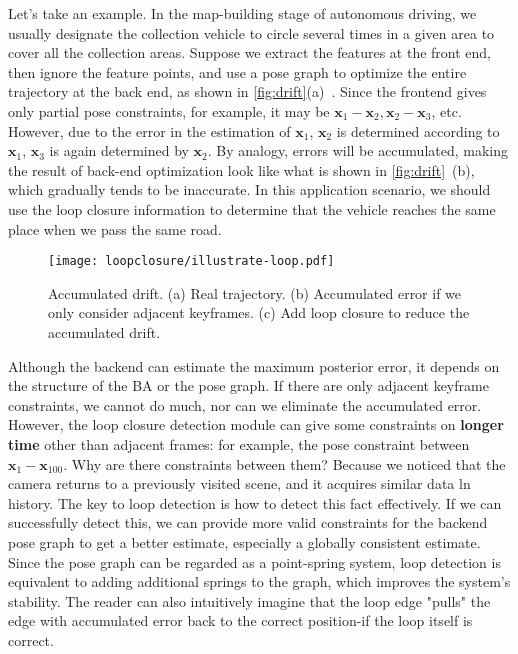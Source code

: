Let's take an example. In the map-building stage of autonomous driving, we usually designate the collection vehicle to circle several times in a given area to cover all the collection areas. Suppose we extract the features at the front end, then ignore the feature points, and use a pose graph to optimize the entire trajectory at the back end, as shown in \autoref{fig:drift}(a)~. Since the frontend gives only partial pose constraints, for example, it may be $\bm{x}_1-\bm{x}_2, \bm{x}_2-\bm{x}_3$, etc. However, due to the error in the estimation of $\bm{x}_1$, $\bm{x}_2$ is determined according to $\bm{x}_1$, $\bm{x}_3$ is again determined by $ \bm{x}_2$. By analogy, errors will be accumulated, making the result of back-end optimization look like what is shown in \autoref{fig:drift}~(b), which gradually tends to be inaccurate. In this application scenario, we should use the loop closure information to determine that the vehicle reaches the same place when we pass the same road.

\begin{figure}[!htp]
	\centering
	\texttt{[image: loopclosure/illustrate-loop.pdf]}
	\caption{Accumulated drift. (a) Real trajectory. (b) Accumulated error if we only consider adjacent keyframes. (c) Add loop closure to reduce the accumulated drift. }
	\label{fig:drift}
\end{figure}

Although the backend can estimate the maximum posterior error, it depends on the structure of the BA or the pose graph. If there are only adjacent keyframe constraints, we cannot do much, nor can we eliminate the accumulated error. However, the loop closure detection module can give some constraints on \textbf{longer time} other than adjacent frames: for example, the pose constraint between $\bm{x}_1-\bm{x}_{100}$. Why are there constraints between them? Because we noticed that the camera returns to a previously visited scene, and it acquires similar data ln history. The key to loop detection is how to detect this fact effectively. If we can successfully detect this, we can provide more valid constraints for the backend pose graph to get a better estimate, especially a globally consistent estimate. Since the pose graph can be regarded as a point-spring system, loop detection is equivalent to adding additional springs to the graph, which improves the system's stability. The reader can also intuitively imagine that the loop edge "pulls" the edge with accumulated error back to the correct position-if the loop itself is correct.

